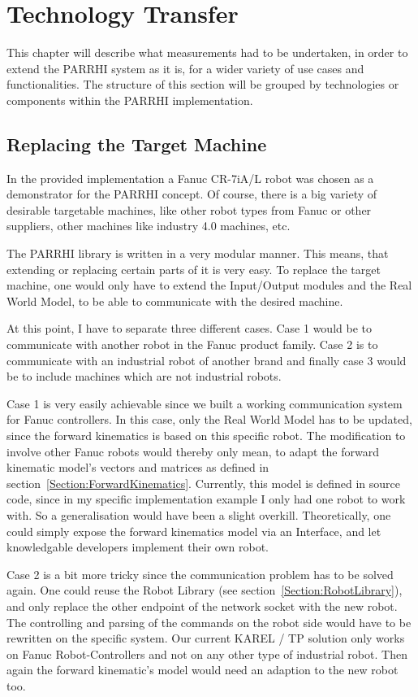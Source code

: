 \chapter{Technology Transfer}
\label{Chap:TechnologyTransfer}
\label{Section:TechnologyTransfer}

This chapter will describe what measurements had to be undertaken, in order to extend the PARRHI system as it is, for a wider variety of use cases and functionalities. The structure of this section will be grouped by technologies or components within the PARRHI implementation.

\section{Replacing the Target Machine}
In the provided implementation a Fanuc CR-7iA/L robot was chosen as a demonstrator for the PARRHI concept. Of course, there is a big variety of desirable targetable machines, like other robot types from Fanuc or other suppliers, other machines like industry 4.0 machines, etc.

The PARRHI library is written in a very modular manner. This means, that extending or replacing certain parts of it is very easy. To replace the target machine, one would only have to extend the Input/Output modules and the Real World Model, to be able to communicate with the desired machine.

At this point, I have to separate three different cases. Case 1 would be to communicate with another robot in the Fanuc product family. Case 2 is to communicate with an industrial robot of another brand and finally case 3 would be to include machines which are not industrial robots. 

Case 1 is very easily achievable since we built a working communication system for Fanuc controllers. In this case, only the Real World Model has to be updated, since the forward kinematics is based on this specific robot. The modification to involve other Fanuc robots would thereby only mean, to adapt the forward kinematic model's vectors and matrices as defined in section~\ref{Section:ForwardKinematics}. Currently, this model is defined in source code, since in my specific implementation example I only had one robot to work with. So a generalisation would have been a slight overkill. Theoretically, one could simply expose the forward kinematics model via an Interface, and let knowledgable developers implement their own robot. 

Case 2 is a bit more tricky since the communication problem has to be solved again. One could reuse the Robot Library (see section~\ref{Section:RobotLibrary}), and only replace the other endpoint of the network socket with the new robot. The controlling and parsing of the commands on the robot side would have to be rewritten on the specific system. Our current KAREL / TP solution only works on Fanuc Robot-Controllers and not on any other type of industrial robot. Then again the forward kinematic's model would need an adaption to the new robot too.


